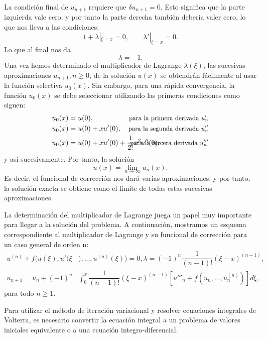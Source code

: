 La condición final de $u_{n+1}$ requiere que $\delta u_{n+1} = 0$. Esto significa que la parte izquierda vale cero, y por tanto la parte derecha también debería valer cero, lo que nos lleva a las condiciones:
\begin{equation}
	1 + \lambda |_{\xi = x} = 0, \qquad \lambda'|_{\xi = x} = 0.
\end{equation}
Lo que al final nos da
\begin{equation}
	\lambda = -1.
\end{equation}
Una vez hemos determinado el multiplicador de Lagrange $\lambda(\xi)$, las sucesivas aproximaciones $u_{n+1}, n \geqslant 0$, de la solución $u(x)$ se obtendrán fácilmente al usar la función selectiva $u_0(x)$. Sin embargo, para una rápida convergencia, la función $u_0(x)$ se debe seleccionar utilizando las primeras condiciones como siguen:
\begin{align}
	u_0(x) &= u(0),  \shorteqnote{para la primera derivada $u'_n$}  &   \\
	u_0(x) &= u(0) + xu'(0),  \shorteqnote{para la segunda derivada $u''_n$}  &   \\
	u_0(x) &= u(0) + xu'(0) + \dfrac{1}{2!}x^2u''(0), \qquad \qquad \qquad \shorteqnote{para la tercera derivada $u'''_n$}
\end{align}
y así sucesivamente. Por tanto, la solución 
\begin{equation}
	u(x) = \lim_{n\rightarrow \infty} u_n(x).
\end{equation}
Es decir, el funcional de corrección nos dará varias aproximaciones, y por tanto, la solución exacta se obtiene como el límite de todas estas sucesivas aproximaciones.

La determinación del multiplicador de Lagrange juega un papel muy importante para llegar a la solución del problema. A continuación, mostramos un esquema correspondiente al multiplicador de Lagrange y su funcional de corrección para un caso general de orden n:
	\begin{align}
	u^{(n)} + f(u(\xi),u'(\xi&),...,u^{(n)}(\xi)) = 0, \lambda = (-1)^n\dfrac{1}{(n-1)!}(\xi - x)^{(n-1)},      &   \\
	u_{n+1} = u_n + (-1)^n & \int_{0}^{x} \dfrac{1}{(n-1)!}(\xi - x)^{(n-1)}[u'''_n + f(u_n,...,u^{(n)}_n)]d\xi,    &
\end{align}
para todo $n \geqslant 1$.

Para utilizar el método de iteración variacional y resolver ecuaciones integrales de Volterra, es necesario convertir la ecuación integral a un problema de valores iniciales equivalente o a una ecuación integro-diferencial.

